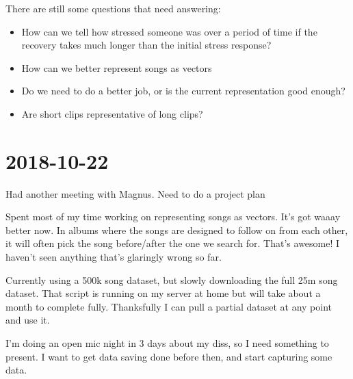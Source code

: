 \documentclass{article}
\begin{document}
	There are still some questions that need answering:

	\begin{itemize}
		\item How can we tell how stressed someone was over a period of time if the recovery takes much longer than the initial stress response?
		\item How can we better represent songs as vectors
		\item Do we need to do a better job, or is the current representation good enough?
		\item Are short clips representative of long clips?
	\end{itemize}

	\section{2018-10-22}
	Had another meeting with Magnus. Need to do a project plan
	
	Spent most of my time working on representing songs as vectors. It's got waaay better now. In albums where the songs are designed to follow on from each other, it will often pick the song before/after the one we search for. That's awesome! I haven't seen anything that's glaringly wrong so far.
	
	Currently using a 500k song dataset, but slowly downloading the full 25m song dataset. That script is running on my server at home but will take about a month to complete fully. Thanksfully I can pull a partial dataset at any point and use it.
	
	I'm doing an open mic night in 3 days about my diss, so I need something to present. I want to get data saving done before then, and start capturing some data.
		
\end{document}
